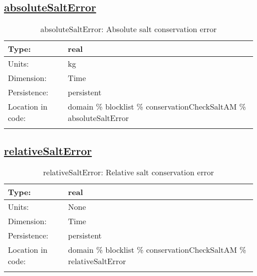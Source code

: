 \subsection[absoluteSaltError]{\hyperref[sec:var_tab_conservationCheckSaltAM]{absoluteSaltError}}
\label{subsec:var_sec_conservationCheckSaltAM_absoluteSaltError}
\begin{center}
\begin{longtable}{| p{2.0in} | p{4.0in} |}
        \hline 
        Type: & real \\
        \hline 
        Units: & \si{kg} \\
        \hline 
        Dimension: & Time \\
        \hline 
        Persistence: & persistent \\
        \hline 
         Location in code: & domain \% blocklist \% conservationCheckSaltAM \% absoluteSaltError \\
         \hline 
    \caption{absoluteSaltError: Absolute salt conservation error}
\end{longtable}
\end{center}
\subsection[relativeSaltError]{\hyperref[sec:var_tab_conservationCheckSaltAM]{relativeSaltError}}
\label{subsec:var_sec_conservationCheckSaltAM_relativeSaltError}
\begin{center}
\begin{longtable}{| p{2.0in} | p{4.0in} |}
        \hline 
        Type: & real \\
        \hline 
        Units: & \si{None} \\
        \hline 
        Dimension: & Time \\
        \hline 
        Persistence: & persistent \\
        \hline 
         Location in code: & domain \% blocklist \% conservationCheckSaltAM \% relativeSaltError \\
         \hline 
    \caption{relativeSaltError: Relative salt conservation error}
\end{longtable}
\end{center}
